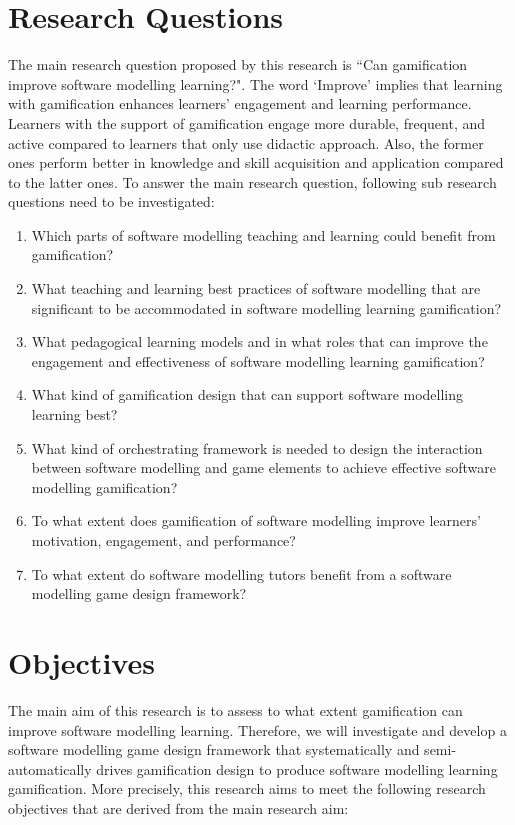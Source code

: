 \documentclass[12pt, a4paper]{report}
\begin{document}
{\section{Research Questions}
The main research question proposed by this research is ``Can gamification improve software modelling learning?". The word `Improve' implies that learning with gamification enhances learners' engagement and learning performance. Learners with the support of gamification engage more durable, frequent, and active compared to learners that only use didactic approach. Also, the former ones perform better in knowledge and skill acquisition and application compared to the latter ones. To answer the main research question, following sub research questions need to be investigated:
\begin{enumerate}
\item Which parts of software modelling teaching and learning could benefit from gamification?
\item What teaching and learning best practices of software modelling that are significant to be accommodated in software modelling learning gamification?
\item What pedagogical learning models and in what roles that can improve the engagement and effectiveness of software modelling learning gamification?
\item What kind of gamification design that can support software modelling learning best? 
\item What kind of orchestrating framework is needed to design the interaction between software modelling and game elements to achieve effective software modelling gamification?
\item To what extent does gamification of software modelling improve learners' motivation, engagement, and performance?
\item To what extent do software modelling tutors benefit from a software modelling game design framework?
\end{enumerate}

\section{Objectives}
\label{Objectives}
The main aim of this research is to assess to what extent gamification can improve software modelling learning. Therefore, we will investigate and develop a software modelling game design framework that systematically and semi-automatically drives gamification design to produce software modelling learning gamification. More precisely, this research aims to meet the following research objectives that are derived from the main research aim:

}
\end{document}

